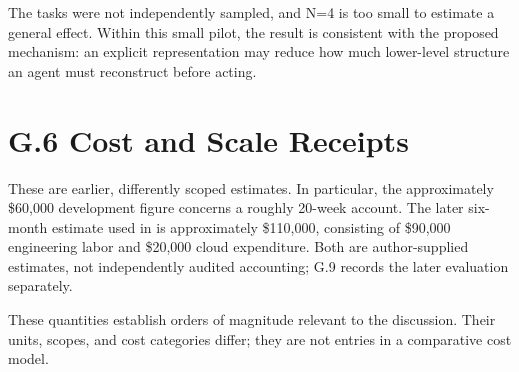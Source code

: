 The tasks were not independently sampled, and N=4 is too small to estimate a general effect. Within this small pilot, the result is consistent with the proposed mechanism: an explicit representation may reduce how much lower-level structure an agent must reconstruct before acting.


\section{G.6 Cost and Scale Receipts}\label{heading:cost-receipt}

These are earlier, differently scoped estimates. In particular, the approximately \$60,000 development figure concerns a roughly 20-week account. The later six-month estimate used in  is approximately \$110,000, consisting of \$90,000 engineering labor and \$20,000 cloud expenditure. Both are author-supplied estimates, not independently audited accounting; G.9 records the later evaluation separately.

These quantities establish orders of magnitude relevant to the  discussion. Their units, scopes, and cost categories differ; they are not entries in a comparative cost model.

